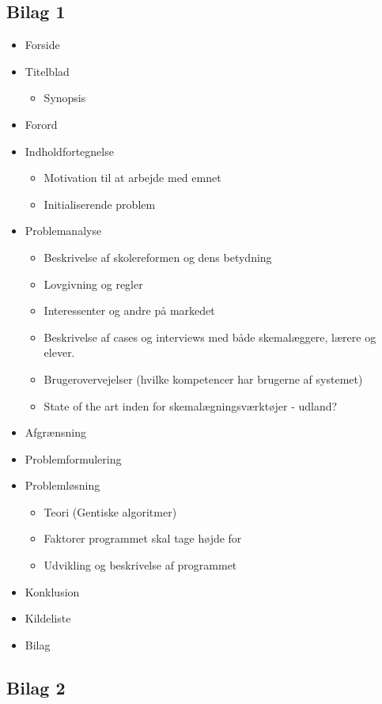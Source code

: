 \documentclass[hidelinks, 12pt]{article}
\begin{document}
	\subsection*{Bilag 1}
	\begin{itemize}
		\item Forside
		\item Titelblad
		\begin{itemize}
			\item Synopsis
		\end{itemize}
		\item Forord
		\item Indholdfortegnelse
		\begin{itemize}
			\item Motivation til at arbejde med emnet
			\item Initialiserende problem 
		\end{itemize}
		\item Problemanalyse
		\begin{itemize}
			\item Beskrivelse af skolereformen og dens betydning
			\item Lovgivning og regler
			\item Interessenter og andre på markedet
			\item Beskrivelse af cases og interviews med både skemalæggere, lærere og elever.
			\item Brugerovervejelser (hvilke kompetencer har brugerne af systemet)
			\item State of the art inden for skemalægningsværktøjer - udland?
		\end{itemize}
		\item Afgrænsning
		\item Problemformulering
		\item Problemløsning
		\begin{itemize}
			\item Teori (Gentiske algoritmer)
			\item Faktorer programmet skal tage højde for
			\item Udvikling og beskrivelse af programmet
		\end{itemize}
		\item Konklusion
		\item Kildeliste
		\item Bilag
	\end{itemize}

	\subsection*{Bilag 2}
\end{document}
